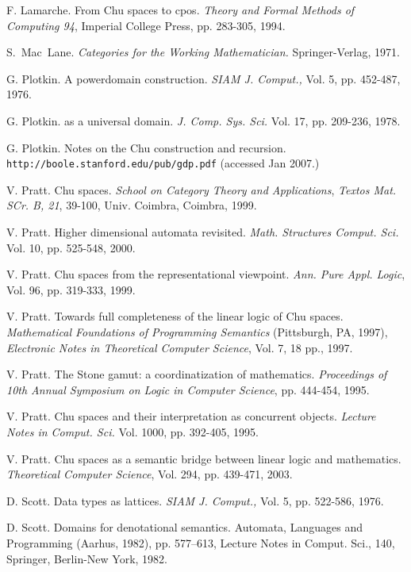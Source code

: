 \documentclass{LMCS}
\begin{document}
\begin{thebibliography}{10}
F. Lamarche. 
From Chu spaces to cpos. {\em Theory and Formal Methods of Computing 94}, Imperial College Press,
pp. 283-305, 1994. 



S.~Mac~Lane. 
\emph{Categories for the Working Mathematician.} 
Springer-Verlag, 1971. 


G. Plotkin. 
A powerdomain construction. {\em SIAM J. Comput.,} Vol. 5, pp. 452-487, 1976. 

G. Plotkin. 
 as a universal domain. 
{\em J. Comp. Sys. Sci.} Vol. 17, pp. 209-236, 1978. 


G. Plotkin. Notes on the Chu construction and recursion. 
\verb+http://boole.stanford.edu/pub/gdp.pdf+ (accessed Jan 2007.) 

V. Pratt. 
Chu spaces. {\em School on Category Theory and Applications},  {\em Textos Mat. SCr. B, 21}, 39-100,  Univ. Coimbra, Coimbra, 1999. 


V.   Pratt. 
Higher dimensional automata revisited. {\em Math. Structures Comput. Sci.} 
Vol. 10, pp.  525-548, 2000. 


V. Pratt. 
Chu spaces from the representational viewpoint. {\em Ann. Pure Appl. Logic}, Vol. 96, pp.  319-333, 1999. 

V. Pratt. 
Towards full completeness of the linear logic of Chu spaces. 
{\em Mathematical {F}oundations of {P}rogramming {S}emantics} (Pittsburgh, PA, 1997),
{\em Electronic Notes in Theoretical Computer Science}, Vol. 7, 18 pp., 1997. 


V. Pratt. 
The Stone gamut: a coordinatization of mathematics. {\em Proceedings of 10th Annual Symposium on
Logic in Computer Science}, pp. 444-454, 1995. 

V. Pratt. 
Chu spaces and their interpretation as concurrent objects. {\em Lecture Notes in Comput. Sci.} Vol. 1000,
pp. 392-405, 1995. 

V. Pratt. 
Chu spaces as a semantic bridge between linear logic and mathematics. 
{\em Theoretical Computer Science},  Vol. 294, pp.  439-471, 2003. 

D. Scott. Data types as lattices. {\em SIAM J. Comput.,} Vol. 5, pp. 522-586, 1976. 

D. Scott. 
Domains for denotational semantics. Automata, {L}anguages and {P}rogramming (Aarhus, 1982),
pp. 577--613, Lecture Notes in Comput. Sci., 140, Springer, Berlin-New York, 1982. 



\end{thebibliography}
\end{document}
